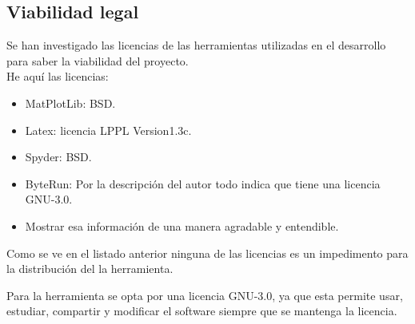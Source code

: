 \subsection{Viabilidad legal}
Se han investigado las licencias de las herramientas utilizadas en el desarrollo para saber la  viabilidad del proyecto.\\ 

He aquí las licencias:

\begin{itemize}
	\item MatPlotLib: BSD.
	\item Latex: licencia LPPL Version1.3c.
	\item Spyder: BSD.
	\item ByteRun: Por la descripción del autor todo indica que tiene una licencia GNU-3.0.
	\item Mostrar esa información de una manera agradable y entendible.
\end{itemize}

Como se ve en el listado anterior ninguna de las licencias es un impedimento para la distribución del la herramienta.

Para la herramienta se opta por una licencia GNU-3.0, ya que esta permite usar, estudiar, compartir y modificar el software siempre que se mantenga la licencia.



